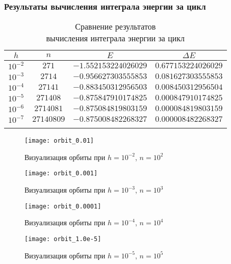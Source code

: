 \begin{frame}
\frametitle{Результаты вычисления интеграла энергии за цикл}

\begin{table}[h]
  \centering
  \caption{Сравнение результатов \\ вычисления интеграла энергии за цикл}
  \begin{tabular}{cccc}
    \toprule
    $ h $ &
    $ n $ &
    $ E $ &
    $ \Delta E $ \\
    \midrule
    $ 10^{-2} $ & $ 271 $ & $ -1.552153224026029 $ & $ 0.677153224026029 $ \\
    \arrayrulecolor{black!40}
    \midrule
    $ 10^{-3} $ & $ 2714 $ & $ -0.956627303555853 $ & $ 0.081627303555853 $ \\
    \midrule
    $ 10^{-4} $ & $ 27141 $ & $ -0.883450312956503 $ & $ 0.008450312956504 $ \\
    \midrule
    $ 10^{-5} $ & $ 271408 $ & $ -0.875847910174825 $ & $ 0.000847910174825 $ \\
    \midrule
    $ 10^{-6} $ & $ 2714081 $ & $ -0.875084819803159 $ & $ 0.000084819803159 $ \\
    \midrule
    $ 10^{-7} $ & $ 27140809 $ & $ -0.875008482268327 $ & $ 0.000008482268327 $ \\
    \arrayrulecolor{black}
    \bottomrule
  \end{tabular}
\end{table}

\end{frame}

\begin{frame}
\begin{figure}[h]
  \centering
  \texttt{[image: orbit\_0.01]}
  \caption{Визуализация орбиты при $ h = 10^{-2} $, $ n = 10^2 $}
\end{figure}
\end{frame}

\begin{frame}
\begin{figure}[h]
  \centering
  \texttt{[image: orbit\_0.001]}
  \caption{Визуализация орбиты при $ h = 10^{-3} $, $ n = 10^3 $}
\end{figure}
\end{frame}

\begin{frame}
\begin{figure}[h]
  \centering
  \texttt{[image: orbit\_0.0001]}
  \caption{Визуализация орбиты при $ h = 10^{-4} $, $ n = 10^4 $}
\end{figure}
\end{frame}

\begin{frame}
\begin{figure}[h]
  \centering
  \texttt{[image: orbit\_1.0e-5]}
  \caption{Визуализация орбиты при $ h = 10^{-5} $, $ n = 10^5 $}
\end{figure}
\end{frame}


